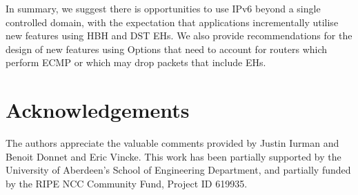 \documentclass[conference]{IEEEtran}
\begin{document}
In summary, we suggest there is opportunities to use IPv6 beyond a single controlled domain, with the expectation that applications incrementally utilise new features using HBH and DST EHs. We also provide recommendations for the design of new features using Options that need to account for routers which perform ECMP or which may drop packets that include EHs.

\section*{Acknowledgements}

The authors appreciate the valuable comments provided by Justin Iurman and Benoit Donnet and Eric Vincke. This work has been partially supported by the University of Aberdeen's School of Engineering Department, and partially funded by the RIPE
NCC Community Fund, Project ID 619935.


\small

\end{document}
